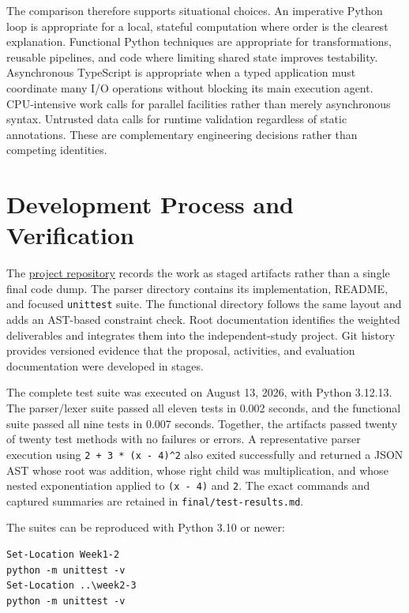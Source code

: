 \documentclass[12pt]{article}
\begin{document}
The comparison therefore supports situational choices. An imperative Python loop is appropriate for a local, stateful computation where order is the clearest explanation. Functional Python techniques are appropriate for transformations, reusable pipelines, and code where limiting shared state improves testability. Asynchronous TypeScript is appropriate when a typed application must coordinate many I/O operations without blocking its main execution agent. CPU-intensive work calls for parallel facilities rather than merely asynchronous syntax. Untrusted data calls for runtime validation regardless of static annotations. These are complementary engineering decisions rather than competing identities.


\section{Development Process and Verification}

The \href{https://github.com/VivekReddy10-08-2004/COS360-OR-497}{project repository} records the work as staged artifacts rather than a single final code dump. The parser directory contains its implementation, README, and focused \texttt{unittest} suite. The functional directory follows the same layout and adds an AST-based constraint check. Root documentation identifies the weighted deliverables and integrates them into the independent-study project. Git history provides versioned evidence that the proposal, activities, and evaluation documentation were developed in stages.


The complete test suite was executed on August 13, 2026, with Python 3.12.13. The parser/lexer suite passed all eleven tests in 0.002 seconds, and the functional suite passed all nine tests in 0.007 seconds. Together, the artifacts passed twenty of twenty test methods with no failures or errors. A representative parser execution using \texttt{2\ +\ 3\ *\ (x\ -\ 4)\textasciicircum{}2} also exited successfully and returned a JSON AST whose root was addition, whose right child was multiplication, and whose nested exponentiation applied to \texttt{(x\ -\ 4)} and \texttt{2}. The exact commands and captured summaries are retained in \texttt{final/test-results.md}.


The suites can be reproduced with Python 3.10 or newer:


\begin{lstlisting}
Set-Location Week1-2
python -m unittest -v
Set-Location ..\week2-3
python -m unittest -v
\end{lstlisting}
\end{document}
